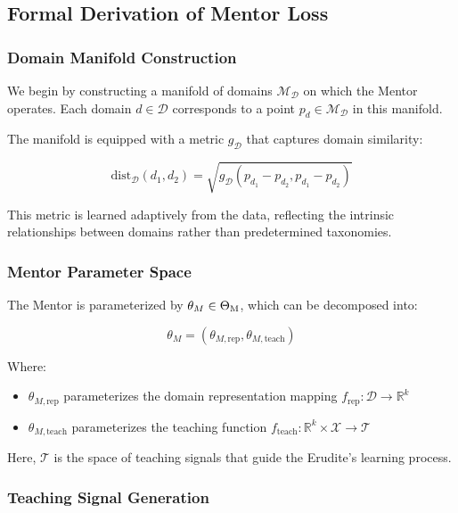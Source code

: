 \subsection{Formal Derivation of Mentor Loss}

\subsubsection{Domain Manifold Construction}

We begin by constructing a manifold of domains $\mathcal{M}_{\mathcal{D}}$ on which the Mentor operates. Each domain $d \in \mathcal{D}$ corresponds to a point $p_d \in \mathcal{M}_{\mathcal{D}}$ in this manifold.

The manifold is equipped with a metric $g_{\mathcal{D}}$ that captures domain similarity:

\begin{equation}
\text{dist}_{\mathcal{D}}(d_1, d_2) = \sqrt{g_{\mathcal{D}}(p_{d_1} - p_{d_2}, p_{d_1} - p_{d_2})}
\end{equation}

This metric is learned adaptively from the data, reflecting the intrinsic relationships between domains rather than predetermined taxonomies.

\subsubsection{Mentor Parameter Space}

The Mentor is parameterized by $\theta_M \in \Theta_{\text{M}}$, which can be decomposed into:

\begin{equation}
\theta_M = (\theta_{M,\text{rep}}, \theta_{M,\text{teach}})
\end{equation}

Where:
\begin{itemize}
\item $\theta_{M,\text{rep}}$ parameterizes the domain representation mapping $f_{\text{rep}} : \mathcal{D} \rightarrow \mathbb{R}^k$
\item $\theta_{M,\text{teach}}$ parameterizes the teaching function $f_{\text{teach}} : \mathbb{R}^k \times \mathcal{X} \rightarrow \mathcal{T}$
\end{itemize}

Here, $\mathcal{T}$ is the space of teaching signals that guide the Erudite's learning process.

\subsubsection{Teaching Signal Generation}

